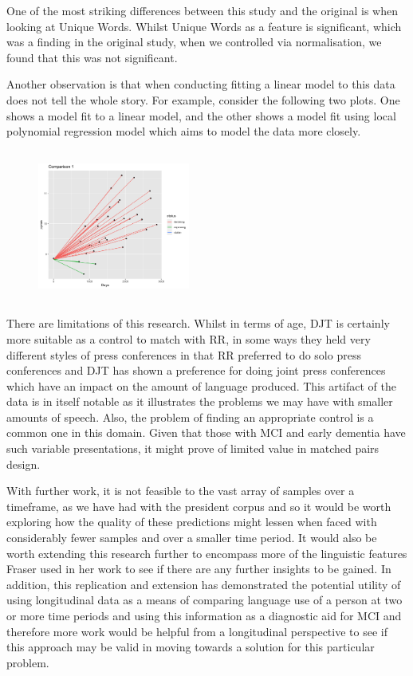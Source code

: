 \documentclass[12pt]{article}
\begin{document}
One of the most striking differences between this study and the original is when looking at Unique Words. Whilst Unique Words as a feature is significant, which was a finding in the original study, when we controlled via normalisation, we found that this was not significant. 
\par
Another observation is that when conducting fitting a linear model to this data does not tell the whole story. For example, consider the following two plots. One shows a model fit to a linear  model, and the other shows a model fit using local polynomial regression model which aims to model the data more closely. 

\begin{figure}
\centering
\includegraphics[width=5cm, height=5cm]{comp1.png}
\end{figure}
 
There are limitations of this research. Whilst in terms of age, DJT is certainly more suitable as a control to match with RR, in some ways they held very different styles of press conferences in that RR preferred to do solo press conferences and DJT has shown a preference for doing joint press conferences which have an impact on the amount of language produced. This artifact of the data is in itself notable as it illustrates the problems we may have with smaller amounts of speech. Also, the problem of finding an appropriate control is a common one in this domain. Given that those with MCI and early dementia have such variable presentations, it might prove of limited value in matched pairs design. 
\par 
With further work, it is not feasible to the vast array of samples over a timeframe, as we have had with the president corpus and so it would be worth exploring how the quality of these predictions might lessen when faced with considerably fewer samples and over a smaller time period. It would also be worth extending this research further to encompass more of the linguistic features Fraser used in her work \cite{Fraser2015} to see if there are any further insights to be gained. In addition, this replication and extension has demonstrated the potential utility of using longitudinal data as a means of comparing language use of a person at two or more time periods and using this information as a diagnostic aid for MCI and therefore more work would be helpful from a longitudinal perspective to see if this approach may be valid in moving towards a solution for this particular problem. 
\end{document}
